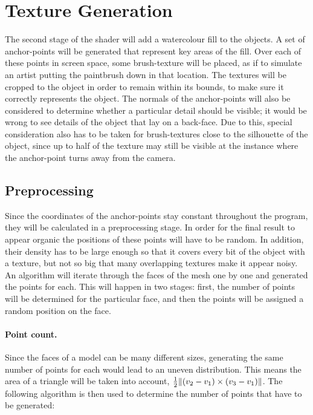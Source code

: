 \documentclass[a4paper, 12pt]{article}
\DeclarePairedDelimiter{\norm}{\lVert}{\rVert}
\begin{document}
\section{Texture Generation}

The second stage of the shader will add a watercolour fill to the objects. A set of anchor-points will be generated that represent key areas of the fill. Over each of these points in screen space, some brush-texture will be placed, as if to simulate an artist putting the paintbrush down in that location. The textures will be cropped to the object in order to remain within its bounds, to make sure it correctly represents the object. The normals of the anchor-points will also be considered to determine whether a particular detail should be visible; it would be wrong to see details of the object that lay on a back-face. Due to this, special consideration also has to be taken for brush-textures close to the silhouette of the object, since up to half of the texture may still be visible at the instance where the anchor-point turns away from the camera.


\subsection{Preprocessing}

Since the coordinates of the anchor-points stay constant throughout the program, they will be calculated in a preprocessing stage. In order for the final result to appear organic the positions of these points will have to be random. In addition, their density has to be large enough so that it covers every bit of the object with a texture, but not so big that many overlapping textures make it appear noisy. An algorithm will iterate through the faces of the mesh one by one and generated the points for each. This will happen in two stages: first, the number of points will be determined for the particular face, and then the points will be assigned a random position on the face.

\paragraph{Point count.}
Since the faces of a model can be many different sizes, generating the same number of points for each would lead to an uneven distribution. This means the area of a triangle will be taken into account, $\frac{1}{2}\norm{(v_2-v_1) \times (v_3-v_1)}$. The following algorithm is then used to determine the number of points that have to be generated:
\end{document}
